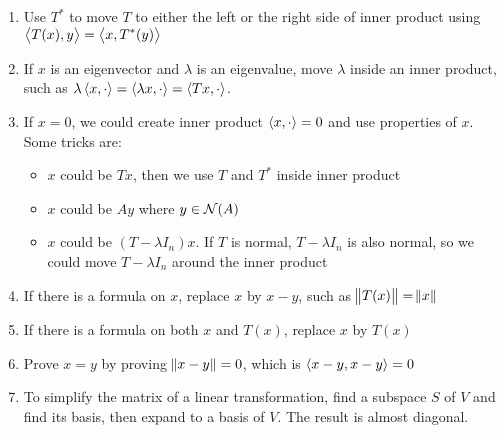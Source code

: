 \begin{enumerate}
    \item Use $T^*$ to move $T$ to either the left or the right side of inner product using $\left\langle \displaystyle T(x), y \right\rangle = \left\langle \displaystyle x, T^* (y) \right\rangle$
    \item If $x$ is an eigenvector and $\lambda$ is an eigenvalue, move $\lambda$ inside an inner product, such as $\lambda \left\langle \displaystyle x, \cdot \right\rangle = \left\langle \displaystyle \lambda x, \cdot \right\rangle = \left\langle \displaystyle Tx, \cdot \right\rangle$.
    \item If $x=0$, we could create inner product $\left\langle \displaystyle x, \cdot \right\rangle = 0$ and use properties of $x$. Some tricks are:
        \begin{itemize}
            \item $x$ could be $Tx$, then we use $T$ and $T^*$ inside inner product
            \item $x$ could be $Ay$ where $y \in \mathcal{N}(A)$
            \item $x$ could be $(T - \lambda I_n)x$. If $T$ is normal, $T-\lambda I_n$ is also normal, so we could move $T-\lambda I_n$ around the inner product
        \end{itemize}
    \item If there is a formula on $x$, replace $x$ by $x-y$, such as $\norm{T(x)} = \norm{x}$
    \item If there is a formula on both $x$ and $T(x)$, replace $x$ by $T(x)$
    \item Prove $x = y$ by proving $\norm{x - y} = 0$, which is $\left\langle \displaystyle x - y, x - y \right\rangle = 0$
    \item To simplify the matrix of a linear transformation, find a subspace $S$ of $V$ and find its basis, then expand to a basis of $V$. The result is almost diagonal. 
\end{enumerate}

